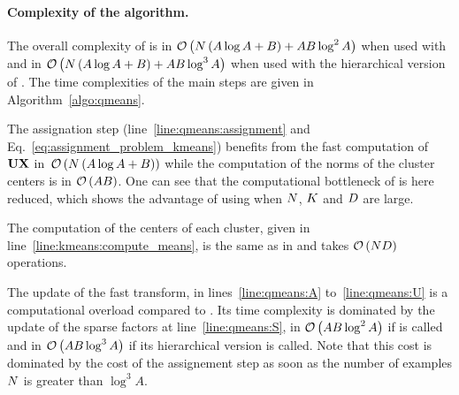 %

\paragraph{Complexity of the \qkmeans algorithm.} The overall complexity of \qkmeans is in $\mathcal{O}\left (N\left(A\log A+B\right ) + AB \log^2 A\right )$ when used with \palm and in $\mathcal{O}\left (N\left(A\log A+B\right ) + AB \log^3 A\right )$ when used with the hierarchical version of \palm. The time complexities of the main steps are given in Algorithm~\ref{algo:qmeans}. 

The assignation step (line~\ref{line:qmeans:assignment} and Eq.~\eqref{eq:assignment_problem_kmeans}) benefits from the fast computation of ${\mathbf{U}} {\mathbf{X}}$ in~$\mathcal{O}\left (N\left(A\log A+B\right )\right )$ while the computation of the norms of the cluster centers is in $\mathcal{O}\left (AB\right )$.
One can see that the computational bottleneck of \kmeans is here reduced, which shows the advantage of using \qkmeans when $N$, $K$ and $D$ are large.

The computation of the centers of each cluster, given in line~\ref{line:kmeans:compute_means}, is the same as in \kmeans and takes $\mathcal{O}\left (ND\right )$ operations.

The update of the fast transform, in lines~\ref{line:qmeans:A} to~\ref{line:qmeans:U} is a computational overload compared to \kmeans. 
Its time complexity is dominated by the update of the sparse factors at line~\ref{line:qmeans:S}, in $\mathcal{O}\left (AB \log^2 A\right )$ if \palm is called and in $\mathcal{O}\left (AB \log^3 A\right )$ if its hierarchical version is called. 
Note that this cost is dominated by the cost of the assignement step as soon as the number of examples $N$ is greater than $\log^3 A$.

